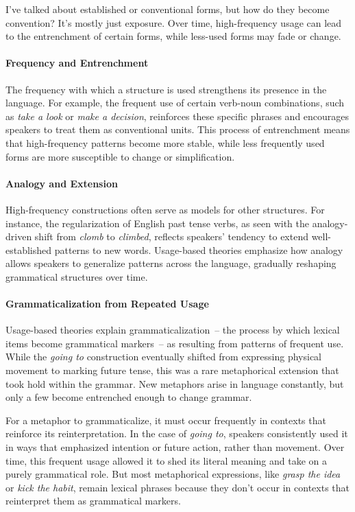 I've talked about established or conventional forms, but how do they become convention? It's mostly just exposure. Over time, high-frequency usage can lead to the entrenchment of certain forms, while less-used forms may fade or change.

\paragraph*{Frequency and Entrenchment}

The frequency with which a structure is used strengthens its presence in the language. For example, the frequent use of certain verb-noun combinations, such as \textit{take a look} or \textit{make a decision}, reinforces these specific phrases and encourages speakers to treat them as conventional units. This process of entrenchment means that high-frequency patterns become more stable, while less frequently used forms are more susceptible to change or simplification.

\paragraph*{Analogy and Extension}

High-frequency constructions often serve as models for other structures. For instance, the regularization of English past tense verbs, as seen with the analogy-driven shift from \textit{clomb} to \textit{climbed}, reflects speakers' tendency to extend well-established patterns to new words. Usage-based theories emphasize how analogy allows speakers to generalize patterns across the language, gradually reshaping grammatical structures over time.

\paragraph*{Grammaticalization from Repeated Usage}

Usage-based theories explain grammaticalization~-- the process by which lexical items become grammatical markers~-- as resulting from patterns of frequent use. While the \textit{going to} construction eventually shifted from expressing physical movement to marking future tense, this was a rare metaphorical extension that took hold within the grammar. New metaphors arise in language constantly, but only a few become entrenched enough to change grammar. 

For a metaphor to grammaticalize, it must occur frequently in contexts that reinforce its reinterpretation. In the case of \textit{going to}, speakers consistently used it in ways that emphasized intention or future action, rather than movement. Over time, this frequent usage allowed it to shed its literal meaning and take on a purely grammatical role. But most metaphorical expressions, like \textit{grasp the idea} or \textit{kick the habit}, remain lexical phrases because they don't occur in contexts that reinterpret them as grammatical markers. 

